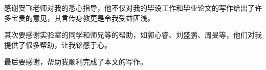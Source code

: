 \begin{ack}
  感谢贺飞老师对我的悉心指导，他不仅对我的毕设工作和毕业论文的写作给出了许多宝贵的意见，其言传身教更是令我受益匪浅。
  
  其次要感谢实验室的同学和师兄等的帮助，如郭心睿、刘盛鹏、周旻等，他们对我提供了很多帮助，让我铭感于心。
  
  最后要感谢\thuthesis，帮助我顺利完成了本文的写作。
\end{ack}
